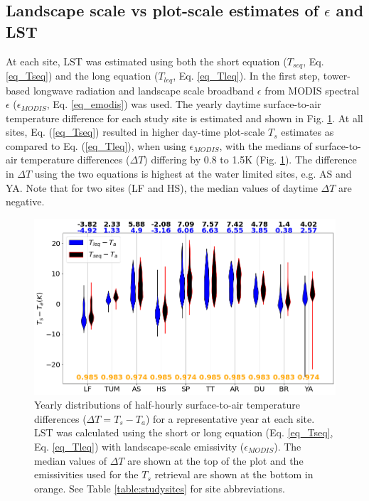 \documentclass[fleqn,10pt]{wlscirep}
\begin{document}
\subsection{Landscape scale vs plot-scale estimates of $\epsilon$ and LST}
At each site, LST was estimated using both the short equation ($T_{seq}$, Eq. \ref{eq_Tseq}) and the long equation ($T_{leq}$, Eq. \ref{eq_Tleq}). In the first step, tower-based longwave radiation and landscape scale broadband $\epsilon$ from MODIS spectral $\epsilon$ ($\epsilon_{MODIS}$, Eq. \ref{eq_emodis}) was used. The yearly daytime surface-to-air temperature difference for each study site is estimated and shown in Fig. \ref{fig:long_short_eq_epsilon_MODIS}. At all sites, Eq. (\ref{eq_Tseq}) resulted in higher day-time plot-scale $T_{s}$ estimates as compared to Eq. (\ref{eq_Tleq}), when using $\epsilon_{MODIS}$, with the medians of surface-to-air temperature differences ($\Delta T$) differing by 0.8 to 1.5K (Fig. \ref{fig:long_short_eq_epsilon_MODIS}). The difference in $\Delta T$ using the two equations is highest at the water limited sites, e.g. AS and YA. Note that for two sites (LF and HS), the median values of daytime $\Delta T$ are negative.
\begin{figure}[h!]
	\includegraphics[scale=0.35]{tsta_violion.png} %
	\centering
    \caption{
     Yearly distributions of half-hourly surface-to-air temperature differences ($\Delta T = T_s - T_a$) for a representative year at each site.  
    LST was calculated using the short or long equation (Eq. \ref{eq_Tseq}, Eq. \ref{eq_Tleq}) with landscape-scale emissivity ($\epsilon_{MODIS}$).
    The median values of $\Delta T$ are shown at the top of the plot and the emissivities used for the $T_{s}$ retrieval are shown at the bottom in orange. See Table \ref{table:studysites} for site abbreviations.}
	\label{fig:long_short_eq_epsilon_MODIS}
\end{figure}
\end{document}
